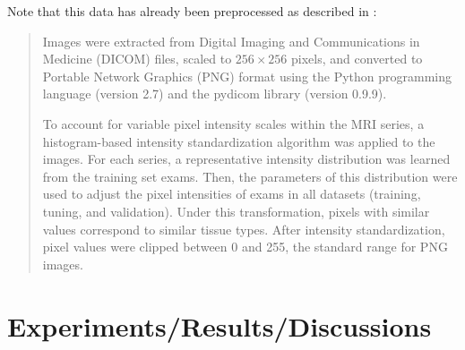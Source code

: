 \documentclass[10pt,twocolumn,letterpaper]{article}
\begin{document}
Note that this data has already been preprocessed as described in \cite{bien2018deep}:
\begin{quotation}
\noindent
   Images were extracted from Digital Imaging and Communications in Medicine (DICOM) files, scaled to $256 \times 256$ pixels, and converted to Portable Network Graphics (PNG) format using the Python programming language (version 2.7) and the pydicom library (version 0.9.9).

   To account for variable pixel intensity scales within the MRI series, a histogram-based intensity standardization algorithm was applied to the images. For each series, a representative intensity distribution was learned from the training set exams. Then, the parameters of this distribution were used to adjust the pixel intensities of exams in all datasets (training, tuning, and validation). Under this transformation, pixels with similar values correspond to similar tissue types. After intensity standardization, pixel values were clipped between 0 and 255, the standard range for PNG images.
\end{quotation}
\section{Experiments/Results/Discussions} %


\end{document}
